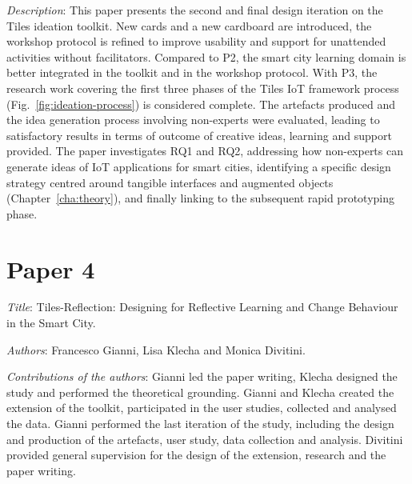 \emph{Description}: This paper presents the second and final design iteration on the Tiles ideation toolkit. New cards and a new cardboard are introduced, the workshop protocol is refined to improve usability and support for unattended activities without facilitators. Compared to P2, the smart city learning domain is better integrated in the toolkit and in the workshop protocol.
With P3, the research work covering the first three phases of the Tiles IoT framework process (Fig.~\ref{fig:ideation-process}) is considered complete. The artefacts produced and the idea generation process involving non-experts were evaluated, leading to satisfactory results in terms of outcome of creative ideas, learning and support provided. The paper investigates RQ1 and RQ2, addressing how non-experts can generate ideas of IoT applications for smart cities, identifying a specific design strategy centred around tangible interfaces and augmented objects (Chapter~\ref{cha:theory}), and finally linking to the subsequent rapid prototyping phase.


\section[P4: Tiles-Reflection: Designing for Reflective Learning and Change Behaviour in the Smart City.][Paper 4]{Paper 4}
\label{paper-4}

\emph{Title}: Tiles-Reflection: Designing for Reflective Learning and Change Behaviour in the Smart City.

\emph{Authors}: Francesco Gianni, Lisa Klecha and Monica Divitini.

\emph{Contributions of the authors}: Gianni led the paper writing, Klecha designed the study and performed the theoretical grounding. Gianni and Klecha created the extension of the toolkit, participated in the user studies, collected and analysed the data. Gianni performed the last iteration of the study, including the design and production of the artefacts, user study, data collection and analysis. Divitini provided general supervision for the design of the extension, research and the paper writing.

